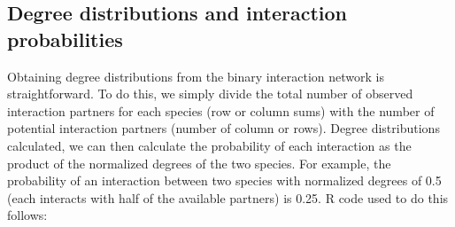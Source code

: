 \documentclass[12pt]{article}
\begin{document}
        



    \subsection*{Degree distributions and interaction probabilities}

      Obtaining degree distributions from the binary interaction 
      network is straightforward. To do this, we simply divide the 
      total number of observed interaction partners for each 
      species (row or column sums) with the number of potential 
      interaction partners (number of column or rows). Degree 
      distributions calculated, we can then calculate the 
      probability of each interaction as the product of the 
      normalized degrees of the two species. For example, the 
      probability of an interaction between two species with 
      normalized degrees of 0.5 (each interacts with half of the 
      available partners) is 0.25. R code used to do this follows:
\end{document}
